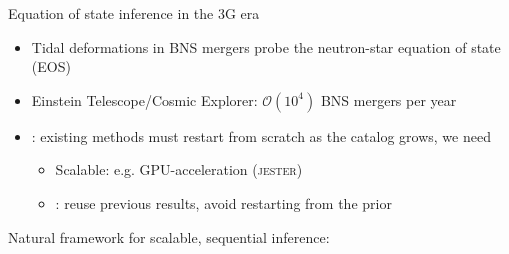 \documentclass[usenames,dvipsnames,t]{beamer}
\begin{document}
\begin{frame}{Equation of state inference in the 3G era}
  \def\x{4mm}
  \def\y{2mm}

  \begin{itemize}
    \item Tidal deformations in BNS mergers probe the neutron-star equation of state (EOS)

    \vspace{\x}

    \item Einstein Telescope/Cosmic Explorer: $\mathcal{O}(10^4)$ BNS mergers per year~



    \vspace{\x}

    \item {}: existing methods must restart from scratch as the catalog grows, we need 

    \begin{itemize}
      \vspace{\y}
      \item Scalable: e.g. GPU-acceleration (\textsc{jester})

      \vspace{\y}

      \item {}: reuse previous results, avoid restarting from the prior
    \end{itemize}
  \end{itemize}

  \vspace{\x}

  \begin{tcolorbox}[colback=blue!5!white,colframe=blue!75!black,title=Goal]
    Natural framework for scalable, sequential inference: 
  \end{tcolorbox}

\end{frame}



\end{document}

